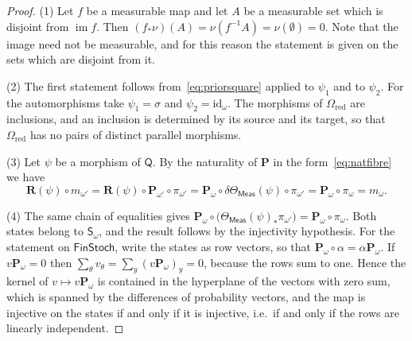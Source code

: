 \documentclass[11pt,a4paper]{article}
\theoremstyle{plain}
\theoremstyle{definition}
\theoremstyle{remark}
\newcommand{\cat}[1]{\mathsf{#1}}
\newcommand{\catO}{\cat{\Omega}}
\newcommand{\Meas}{\cat{Meas}}
\newcommand{\FinStoch}{\cat{FinStoch}}
\newcommand{\id}{\mathrm{id}}
\newcommand{\del}{\delta}
\begin{document}
\begin{proof}
(1) Let $f$ be a measurable map and let $A$ be a measurable set which is
disjoint from $\operatorname{im} f$. Then
$(f_{*}\nu)(A) = \nu(f^{-1}A) = \nu(\emptyset) = 0$. Note that the image need
not be measurable, and for this reason the statement is given on the sets
which are disjoint from it.

(2) The first statement follows from~\eqref{eq:priorsquare} applied to
$\psi_1$ and to $\psi_2$. For the automorphisms take $\psi_1 = \sigma$ and
$\psi_2 = \id_{\omega}$. The morphisms of $\catO_{\mathrm{red}}$ are
inclusions, and an inclusion is determined by its source and its target, so
that $\catO_{\mathrm{red}}$ has no pairs of distinct parallel morphisms.

(3) Let $\psi$ be a morphism of $\cat{Q}$. By the naturality of $\mathbf P$ in
the form~\eqref{eq:natfibre} we have
\[
\mathbf{R}(\psi) \circ m_{\omega'} =
\mathbf{R}(\psi)\circ\mathbf P_{\omega'}\circ\pi_{\omega'} =
\mathbf P_{\omega}\circ\del\Theta_\Meas(\psi)\circ\pi_{\omega'} =
\mathbf P_{\omega}\circ\pi_{\omega} = m_{\omega}.
\]

(4) The same chain of equalities gives
$\mathbf P_{\omega}\circ\bigl(\Theta_\Meas(\psi)_{*}\pi_{\omega'}\bigr) =
\mathbf P_{\omega}\circ\pi_{\omega}$. Both states belong to
$\cat{S}_{\omega}$, and the result follows by the injectivity hypothesis. For
the statement on $\FinStoch$, write the states as row vectors, so that
$\mathbf P_{\omega}\circ\alpha = \alpha\mathbf P_{\omega}$. If
$v\mathbf P_{\omega} = 0$ then
$\sum_{\theta} v_{\theta} = \sum_{y}(v\mathbf P_{\omega})_{y} = 0$, because
the rows sum to one. Hence the kernel of $v \mapsto v\mathbf P_{\omega}$ is
contained in the hyperplane of the vectors with zero sum, which is spanned
by the differences of probability vectors, and the map is injective on the
states if and only if it is injective, i.e.\ if and only if the rows are
linearly independent.
\end{proof}
\end{document}
